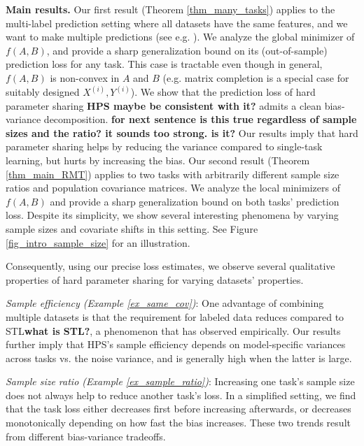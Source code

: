 \textbf{Main results.}
Our first result (Theorem \ref{thm_many_tasks}) applies to the multi-label prediction setting where all datasets have the same features, and we want to make multiple predictions (see e.g. \cite{hsu2009multi}).
We analyze the global minimizer of $f(A, B)$, and provide a sharp generalization bound on its (out-of-sample) prediction loss for any task.
This case is tractable even though in general, $f(A, B)$ is non-convex in $A$ and $B$ (e.g. matrix completion is a special case for suitably designed $X^{(i)}, Y^{(i)}$).
We show that the prediction loss of hard parameter sharing\textbf{ HPS maybe be consistent with it?} admits a clean bias-variance decomposition.\textbf{
for next sentence is this true regardless of sample sizes and the ratio? it sounds too strong. is it?}
Our results imply that hard parameter sharing helps by reducing the variance compared to single-task learning, but hurts by increasing the bias.
Our second result (Theorem \ref{thm_main_RMT}) applies to two tasks with arbitrarily different sample size ratios and population covariance matrices.
We analyze the local minimizers of $f(A, B)$ and provide a sharp generalization bound on both tasks' prediction loss.
Despite its simplicity, we show several interesting phenomena by varying sample sizes and covariate shifts in this setting.
See Figure \ref{fig_intro_sample_size} for an illustration.

 


Consequently, using our precise loss estimates, we observe several qualitative properties of hard parameter sharing for varying datasets' properties.

\textit{Sample efficiency (Example \ref{ex_same_cov})}:
	One advantage of combining multiple datasets is that the requirement for labeled data reduces compared to STL\textbf{what is STL?}, a phenomenon that \citet{ZSSGM18} has observed empirically.
	Our results further imply that HPS's sample efficiency depends on model-specific variances across tasks vs. the noise variance, and is generally high when the latter is large.

\textit{Sample size ratio (Example \ref{ex_sample_ratio})}: Increasing one task's sample size does not always help to reduce another task's loss. In a simplified setting, we find that the task loss either decreases first before increasing afterwards, or decreases monotonically depending on how fast the bias increases. These two trends result from different bias-variance tradeoffs.

